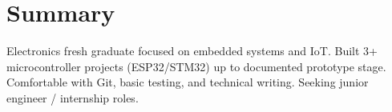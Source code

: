 \section{Summary}
Electronics fresh graduate focused on embedded systems and IoT.
Built 3+ microcontroller projects (ESP32/STM32) up to documented prototype
stage. Comfortable with Git, basic testing, and technical writing.
Seeking junior engineer / internship roles.

